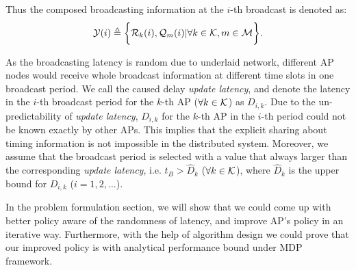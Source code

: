 Thus the composed broadcasting information at the $i$-th broadcast is denoted as:
\begin{align}
    \mathcal{Y}(i) \triangleq
        \bigg\{
            \mathcal{R}_{k}(i), \mathcal{Q}_{m}(i) | \forall k\in\mathcal{K}, m\in\mathcal{M}
        \bigg\}.
\end{align}

As the broadcasting latency is random due to underlaid network, different AP nodes would receive whole broadcast information at different time slots in one broadcast period.
We call the caused delay \emph{update latency}, and denote the latency in the $i$-th broadcast period for the $k$-th AP ($\forall k\in\mathcal{K}$) as $D_{i,k}$.
Due to the un-predictability of \emph{update latency}, $D_{i,k}$ for the $k$-th AP in the $i$-th period could not be known exactly by other APs. This implies that the explicit sharing about timing information is not impossible in the distributed system.
Moreover, we assume that the broadcast period is selected with a value that always larger than the corresponding \emph{update latency}, i.e. $t_B > \hat{D}_k$ ($\forall k\in\mathcal{K}$), where $\hat{D}_k$ is the upper bound for $D_{i,k}$ ($i=1,2,\dots$).

In the problem formulation section, we will show that we could come up with better policy aware of the randomness of latency, and improve AP's policy in an iterative way.
Furthermore, with the help of algorithm design we could prove that our improved policy is with analytical performance bound under MDP framework.



